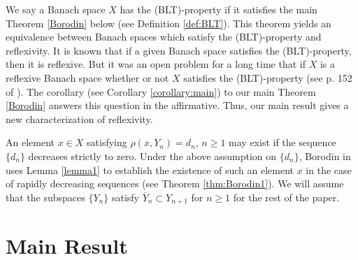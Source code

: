 \documentclass[12pt, reqno]{amsart}
\theoremstyle{definition}
\theoremstyle{remark}
\numberwithin{equation}{section}
\begin{document}

 We say a Banach space  $X$ has the (BLT)-property if it satisfies the main Theorem \ref{Borodin} below (see Definition \ref{def:BLT}).  This theorem yields an equivalence between Banach spaces  which satisfy  the (BLT)-property and reflexivity.  It is known that if a given Banach space satisfies the (BLT)-property, then it is reflexive. But it was an open problem  for a long time that if $X$ is a reflexive Banach space  whether or not  $X$ satisfies the (BLT)-property (see p. 152 of \cite{Sin}).  The corollary (see Corollary \ref{corollary:main}) to our main Theorem \ref{Borodin} answers this question in the affirmative. Thus, our main result gives a new characterization of reflexivity.


  An element $x\in X$ satisfying $\rho(x, Y_n)=d_n$, $n\ge1$ may exist if the sequence $\{d_n\}$ decreases strictly to zero. Under the above assumption on $\{d_n\}$, Borodin  in \cite{Borodin1} uses Lemma \ref{lemma1}  to establish the existence of such an element $x$ in the case of rapidly decreasing sequences (see Theorem  \ref{thm:Borodin1}). We will assume that the subspaces $\{Y_n\}$ satisfy $\overline Y_n\subset Y_{n+1}$ for $n\ge1$  for the rest of the paper.
\section{Main Result}
\end{document}
